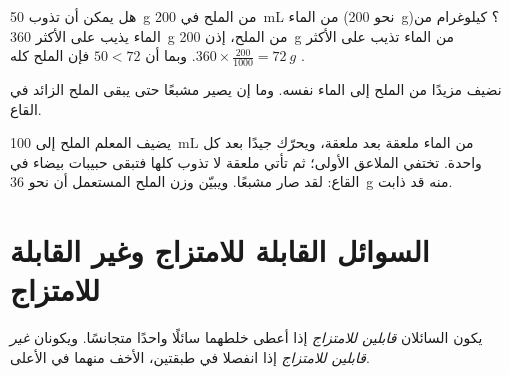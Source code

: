 \begin{example}\label{ex:g6:solutions-and-solubility:glass}
هل يمكن أن تذوب \qty{50}{g} من الملح في \qty{200}{mL} من الماء (نحو
\qty{200}{g})؟ كيلوغرام من الماء يذيب على الأكثر \qty{360}{g} من
الملح، إذن \qty{200}{g} من الماء تذيب على الأكثر $360 \times
\frac{200}{1000} = \qty{72}{g}$. وبما أن $50 < 72$ فإن الملح كله
.
\end{example}

\begin{omfigure}

{\small نضيف مزيدًا من الملح إلى الماء نفسه. وما إن يصير 
مشبعًا حتى يبقى الملح الزائد في القاع.}
\end{omfigure}

\begin{inthelab}
يضيف المعلم الملح إلى \qty{100}{mL} من الماء ملعقة بعد ملعقة، ويحرّك
جيدًا بعد كل واحدة. تختفي الملاعق الأولى؛ ثم تأتي ملعقة لا تذوب كلها
فتبقى حبيبات بيضاء في القاع: لقد صار  مشبعًا. ويبيّن وزن الملح
المستعمل أن نحو \qty{36}{g} منه قد ذابت.
\end{inthelab}

\section{السوائل القابلة للامتزاج وغير القابلة للامتزاج}

\begin{definition}\label{def:g6:solutions-and-solubility:miscible}
يكون السائلان \emph{قابلين للامتزاج} إذا أعطى خلطهما
سائلًا واحدًا متجانسًا. ويكونان \emph{غير قابلين
للامتزاج} إذا انفصلا في طبقتين، الأخف منهما في
الأعلى.
\end{definition}

